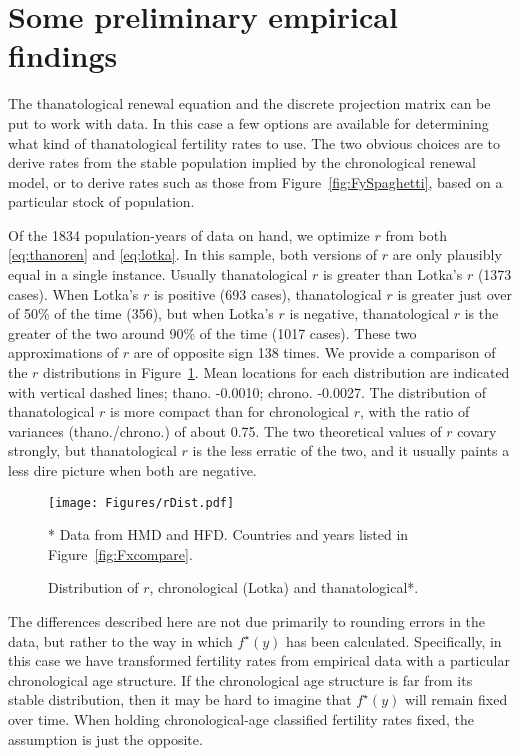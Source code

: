 \documentclass{article}
\begin{document}
\section*{Some preliminary empirical findings}
The thanatological renewal equation and the discrete projection matrix can be
put to work with data. In this case a few options are available for determining
what kind of thanatological fertility rates to use. The two obvious choices are
to derive rates from the stable population implied by the chronological renewal
model, or to derive rates such as those from Figure~\ref{fig:FySpaghetti},
based on a particular stock of population. 

Of the 1834 population-years of data on hand, we optimize $r$ from both
\eqref{eq:thanoren} and \eqref{eq:lotka}. In this sample, both versions of $r$
are only plausibly equal in a single instance. Usually thanatological $r$ is
greater than Lotka's $r$ (1373 cases). When Lotka's $r$ is positive (693 cases), thanatological $r$ is greater just over of 50\% of the time (356), but when Lotka's $r$ is negative,
thanatological $r$ is the greater of the two around 90\% of the time (1017
cases). These two approximations of $r$ are of opposite sign 138 times. We
provide a comparison of the $r$ distributions in Figure~\ref{fig:rDist}. Mean
locations for each distribution are indicated with vertical dashed lines; thano.
-0.0010; chrono. -0.0027. The distribution of thanatological $r$ is more compact
than for chronological $r$, with the ratio of variances (thano./chrono.) of
about 0.75. The two theoretical values of $r$ covary strongly, but
thanatological $r$ is the less erratic of the two, and it usually paints a less dire picture when both are negative.

\begin{figure}[h!]
	\caption{Distribution of $r$, chronological (Lotka) and thanatological*.}
	\begin{center}
		\label{fig:rDist}
		\texttt{[image: Figures/rDist.pdf]}
	\end{center}
	\begin{tiny}
     * Data from HMD and HFD. Countries and years listed in
     Figure~\ref{fig:Fxcompare}.
	\end{tiny}
\end{figure}

The differences described here are not due primarily to rounding errors in the
data, but rather to the way in which $f^\star(y)$ has been calculated. 
Specifically, in this case we have transformed fertility rates from empirical data with a particular
chronological age structure. If the chronological age structure is far from its
stable distribution, then it may be hard to imagine that $f^\star(y)$ will
remain fixed over time. When holding chronological-age classified fertility rates
fixed, the assumption is just the opposite.
\end{document}

